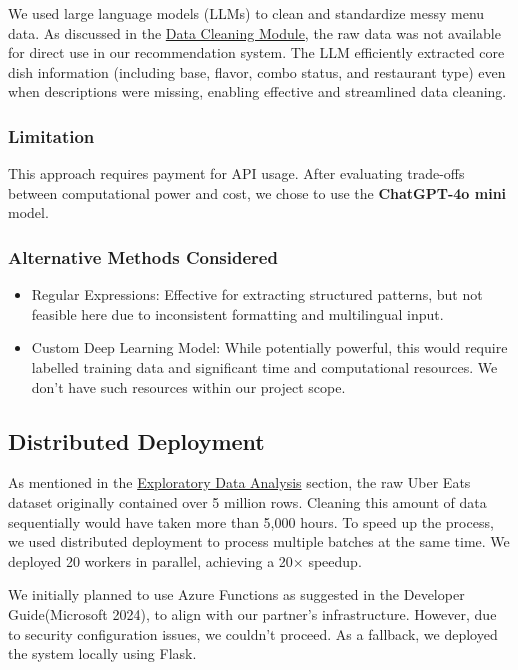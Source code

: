 \documentclass[
  11pt,
  a4paper,
  DIV=11,
  numbers=noendperiod]{scrartcl}
\providecommand{\tightlist}{%
  \setlength{\itemsep}{0pt}\setlength{\parskip}{0pt}}\usepackage{longtable,booktabs,array}
\begin{document}
We used large language models (LLMs) to clean and standardize messy menu
data. As discussed in the \hyperref[data-cleaning-module]{Data Cleaning
Module}, the raw data was not available for direct use in our
recommendation system. The LLM efficiently extracted core dish
information (including base, flavor, combo status, and restaurant type)
even when descriptions were missing, enabling effective and streamlined
data cleaning.

\subsubsection{Limitation}\label{limitation}

This approach requires payment for API usage. After evaluating
trade-offs between computational power and cost, we chose to use the
\textbf{ChatGPT-4o mini} model.

\subsubsection{Alternative Methods
Considered}\label{alternative-methods-considered}

\begin{itemize}
\tightlist
\item
  Regular Expressions: Effective for extracting structured patterns, but
  not feasible here due to inconsistent formatting and multilingual
  input.
\item
  Custom Deep Learning Model: While potentially powerful, this would
  require labelled training data and significant time and computational
  resources. We don't have such resources within our project scope.
\end{itemize}

\subsection{Distributed Deployment}\label{distributed-deployment}

As mentioned in the \hyperref[exploratory-data-analysis]{Exploratory
Data Analysis} section, the raw Uber Eats dataset originally contained
over 5 million rows. Cleaning this amount of data sequentially would
have taken more than 5,000 hours. To speed up the process, we used
distributed deployment to process multiple batches at the same time. We
deployed 20 workers in parallel, achieving a 20× speedup.

We initially planned to use Azure Functions as suggested in the
Developer Guide(Microsoft 2024), to align with our partner's
infrastructure. However, due to security configuration issues, we
couldn't proceed. As a fallback, we deployed the system locally using
Flask.
\end{document}
